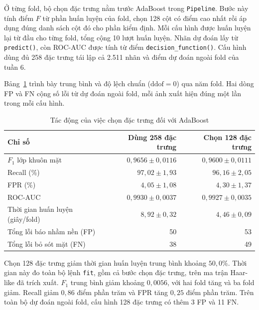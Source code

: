 \documentclass[12pt,a4paper,oneside]{report}
\begin{document}
Ở từng fold, bộ chọn đặc trưng nằm trước AdaBoost trong \texttt{Pipeline}.
Bước này tính điểm $F$ từ phần huấn luyện của fold, chọn 128 cột có
điểm cao nhất rồi áp dụng đúng danh sách cột đó cho phần kiểm định.
Mỗi cấu hình được huấn luyện lại từ đầu cho từng fold, tổng cộng
10 lượt huấn luyện. Nhãn dự đoán lấy từ \texttt{predict()}, còn ROC-AUC
được tính từ điểm \texttt{decision\_function()}. Cấu hình dùng đủ 258
đặc trưng tái lập cả 2.511 nhãn và điểm dự đoán ngoài fold của tuần 6.

Bảng~\ref{tab:week8_selectkbest_results} trình bày trung bình và độ lệch
chuẩn ($\mathrm{ddof}=0$) qua năm fold. Hai dòng FP và FN cộng số lỗi
từ dự đoán ngoài fold, mỗi ảnh xuất hiện đúng một lần trong mỗi cấu hình.

\begin{table}[htbp]
    \centering
    \small
    \caption{Tác động của việc chọn đặc trưng đối với AdaBoost}
    \label{tab:week8_selectkbest_results}
    \begin{tabularx}{\linewidth}{@{}Xrr@{}}
        \toprule
        \textbf{Chỉ số} & \textbf{Dùng 258 đặc trưng} & \textbf{Chọn 128 đặc trưng} \\
        \midrule
        $F_1$ lớp khuôn mặt & $0{,}9656 \pm 0{,}0116$ & $0{,}9600 \pm 0{,}0111$ \\
        Recall (\%) & $97{,}02 \pm 1{,}93$ & $96{,}16 \pm 2{,}05$ \\
        FPR (\%) & $4{,}05 \pm 1{,}08$ & $4{,}30 \pm 1{,}37$ \\
        ROC-AUC & $0{,}9930 \pm 0{,}0037$ & $0{,}9927 \pm 0{,}0035$ \\
        Thời gian huấn luyện (giây/fold) & $8{,}92 \pm 0{,}32$ & $4{,}46 \pm 0{,}09$ \\
        Tổng lỗi báo nhầm nền (FP) & 50 & 53 \\
        Tổng lỗi bỏ sót mặt (FN) & 38 & 49 \\
        \bottomrule
    \end{tabularx}
\end{table}

Chọn 128 đặc trưng giảm thời gian huấn luyện trung bình khoảng
$50{,}0\%$. Thời gian này đo toàn bộ lệnh \texttt{fit}, gồm cả bước
chọn đặc trưng, trên ma trận Haar-like đã trích xuất. $F_1$ trung bình
giảm khoảng $0{,}0056$, với hai fold tăng và ba fold giảm. Recall giảm
$0{,}86$ điểm phần trăm và FPR tăng $0{,}25$ điểm phần trăm. Trên toàn
bộ dự đoán ngoài fold, cấu hình 128 đặc trưng có thêm 3 FP và 11 FN.
\end{document}
